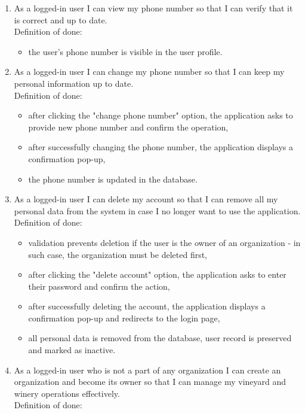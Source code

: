 \begin{enumerate}
\begin{itemize}
		\item the email address is updated in the database.
	\end{itemize}
	\item As a logged-in user I can view my phone number so that I can verify that it is correct and up to date.
	\\Definition of done:
	\begin{itemize}
		\item the user's phone number is visible in the user profile.
	\end{itemize}
	\item As a logged-in user I can change my phone number so that I can keep my personal information up to date.
	\\Definition of done:
	\begin{itemize}
		\item after clicking the "change phone number" option, the application asks to provide new phone number and confirm the operation,
		\item after successfully changing the phone number, the application displays a confirmation pop-up,
		\item the phone number is updated in the database.
	\end{itemize}
	\item As a logged-in user I can delete my account so that I can remove all my personal data from the system in case I no longer want to use the application.
	\\Definition of done:
	\begin{itemize}
		\item validation prevents deletion if the user is the owner of an organization - in such case, the organization must be deleted first,
		\item after clicking the "delete account" option, the application asks to enter their password and confirm the action,
		\item after successfully deleting the account, the application displays a confirmation pop-up and redirects to the login page,
		\item all personal data is removed from the database, user record is preserved and marked as inactive.
	\end{itemize}
	\item As a logged-in user who is not a part of any organization I can create an organization and become its owner so that I can manage my vineyard and winery operations effectively.
	\\Definition of done:

\end{enumerate}
